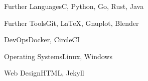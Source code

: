 \documentclass[a4paper,10pt]{cv}
\begin{document}
      \begin{multicols}{2}
        \begin{cvSkillGroup}{Further Languages}{C, Python, Go, Rust, Java}
        \end{cvSkillGroup}
        \begin{cvSkillGroup}{Further Tools}{Git, LaTeX, Gnuplot, Blender}
        \end{cvSkillGroup}
        \begin{cvSkillGroup}{DevOps}{Docker, CircleCI}
        \end{cvSkillGroup}
        \begin{cvSkillGroup}{Operating Systems}{Linux, Windows}
        \end{cvSkillGroup}
        \begin{cvSkillGroup}{Web Design}{HTML, Jekyll}
        \end{cvSkillGroup}

\end{multicols}
\end{document}
